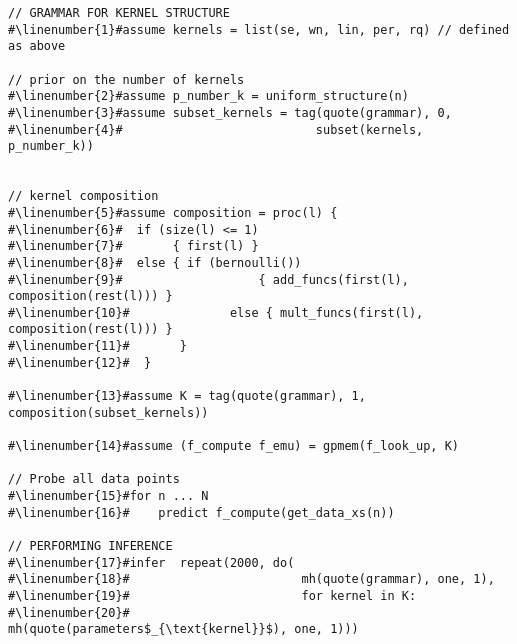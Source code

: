 \begin{mdframed}
\begin{minipage}{\linewidth}
\small
\belowcaptionskip=-10pt
\begin{lstlisting}[mathescape,label=alg:structureVent,basicstyle=\selectfont\ttfamily,numbers=none,escapechar=\#]
// GRAMMAR FOR KERNEL STRUCTURE
#\linenumber{1}#assume kernels = list(se, wn, lin, per, rq) // defined as above

// prior on the number of kernels
#\linenumber{2}#assume p_number_k = uniform_structure(n)
#\linenumber{3}#assume subset_kernels = tag(quote(grammar), 0,
#\linenumber{4}#                           subset(kernels, p_number_k))


// kernel composition
#\linenumber{5}#assume composition = proc(l) {
#\linenumber{6}#  if (size(l) <= 1)
#\linenumber{7}#       { first(l) }
#\linenumber{8}#  else { if (bernoulli()) 
#\linenumber{9}#                   { add_funcs(first(l), composition(rest(l))) }
#\linenumber{10}#              else { mult_funcs(first(l), composition(rest(l))) }
#\linenumber{11}#       }
#\linenumber{12}#  }
                          
#\linenumber{13}#assume K = tag(quote(grammar), 1, composition(subset_kernels))

#\linenumber{14}#assume (f_compute f_emu) = gpmem(f_look_up, K)

// Probe all data points
#\linenumber{15}#for n ... N
#\linenumber{16}#    predict f_compute(get_data_xs(n))

// PERFORMING INFERENCE  
#\linenumber{17}#infer  repeat(2000, do(
#\linenumber{18}#                        mh(quote(grammar), one, 1),
#\linenumber{19}#                        for kernel in K: 
#\linenumber{20}# 			    mh(quote(parameters$_{\text{kernel}}$), one, 1)))
\end{lstlisting}

\end{minipage}
\end{mdframed}
